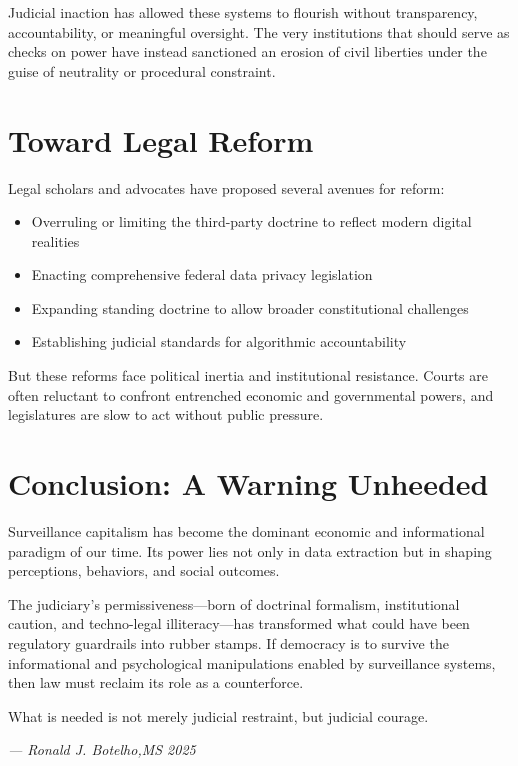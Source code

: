 Judicial inaction has allowed these systems to flourish without transparency, accountability, or meaningful oversight. The very institutions that should serve as checks on power have instead sanctioned an erosion of civil liberties under the guise of neutrality or procedural constraint.

\section{Toward Legal Reform}
Legal scholars and advocates have proposed several avenues for reform:

\begin{itemize}
  \item Overruling or limiting the third-party doctrine to reflect modern digital realities
  \item Enacting comprehensive federal data privacy legislation
  \item Expanding standing doctrine to allow broader constitutional challenges
  \item Establishing judicial standards for algorithmic accountability
\end{itemize}

But these reforms face political inertia and institutional resistance. Courts are often reluctant to confront entrenched economic and governmental powers, and legislatures are slow to act without public pressure.

\section*{Conclusion: A Warning Unheeded}
Surveillance capitalism has become the dominant economic and informational paradigm of our time. Its power lies not only in data extraction but in shaping perceptions, behaviors, and social outcomes.

The judiciary’s permissiveness—born of doctrinal formalism, institutional caution, and techno-legal illiteracy—has transformed what could have been regulatory guardrails into rubber stamps. If democracy is to survive the informational and psychological manipulations enabled by surveillance systems, then law must reclaim its role as a counterforce.

What is needed is not merely judicial restraint, but judicial courage.

\begin{flushright}
\textit{--- Ronald J. Botelho,MS 2025}
\end{flushright}

